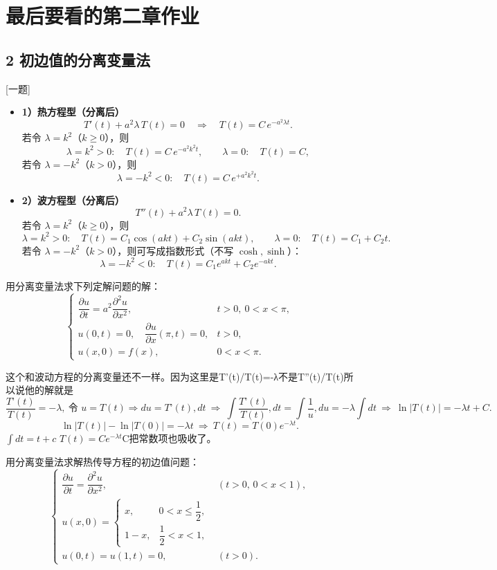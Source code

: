 \chapter{最后要看的第二章作业}
\section{2 初边值的分离变量法}[一题]
\begin{dxtips}
    \begin{itemize}
  \item \textbf{1）热方程型（分离后）}
  \[
  T'(t)+a^{2}\lambda\,T(t)=0
  \quad\Rightarrow\quad
  T(t)=C\,e^{-a^{2}\lambda t}.
  \]
  若令 $\lambda=k^{2}$（$k\ge 0$），则
  \[
  \lambda=k^{2}>0:\quad T(t)=C\,e^{-a^{2}k^{2}t},\qquad
  \lambda=0:\quad T(t)=C,
  \]
  若令 $\lambda=-k^{2}$（$k>0$），则
  \[
  \lambda=-k^{2}<0:\quad T(t)=C\,e^{+a^{2}k^{2}t}.
  \]

  \item \textbf{2）波方程型（分离后）}
  \[
  T''(t)+a^{2}\lambda\,T(t)=0.
  \]
  若令 $\lambda=k^{2}$（$k\ge 0$），则
  \[
  \lambda=k^{2}>0:\quad T(t)=C_{1}\cos(akt)+C_{2}\sin(akt),
  \qquad
  \lambda=0:\quad T(t)=C_{1}+C_{2}t.
  \]
  若令 $\lambda=-k^{2}$（$k>0$），则可写成指数形式（不写 $\cosh,\sinh$）：
  \[
  \lambda=-k^{2}<0:\quad T(t)=C_{1}e^{akt}+C_{2}e^{-akt}.
  \]
\end{itemize}
\end{dxtips}
\begin{homework}[1]
用分离变量法求下列定解问题的解：
\[
\begin{cases}
\dfrac{\partial u}{\partial t}
= a^{2}\dfrac{\partial^{2}u}{\partial x^{2}},
& t>0,\ 0<x<\pi,\\[6pt]
u(0,t)=0,\quad
\dfrac{\partial u}{\partial x}(\pi,t)=0,
& t>0,\\[6pt]
u(x,0)=f(x),
& 0<x<\pi.
\end{cases}
\]
\end{homework}
\begin{dxtips}
这个和波动方程的分离变量还不一样。因为这里是T'(t)/T(t)=-λ不是T''(t)/T(t)所以说他的解就是  $$\frac{T’(t)}{T(t)}=-\lambda,\ \text{令 }u=T(t)\Rightarrow du=T’(t),dt\ \Rightarrow\ \int \frac{T’(t)}{T(t)},dt=\int \frac{1}{u},du=-\lambda\int dt\ \Rightarrow\ \ln|T(t)|=-\lambda t+C.$$
$$\ln|T(t)|-\ln|T(0)|=-\lambda t\ \Rightarrow\ T(t)=T(0)e^{-\lambda t}.$$  $\int dt=t+c$
$T(t)=Ce^{-\lambda t}$C把常数项也吸收了。


\end{dxtips}
\begin{homework}[2]
用分离变量法求解热传导方程的初边值问题：
\[
\begin{cases}
\dfrac{\partial u}{\partial t}
= \dfrac{\partial^2 u}{\partial x^2}, & (t>0,\,0<x<1),\\[6pt]
u(x,0)=
\begin{cases}
x, & 0<x\le\dfrac{1}{2},\\[4pt]
1-x, & \dfrac{1}{2}<x<1,
\end{cases}\\[10pt]
u(0,t)=u(1,t)=0, & (t>0).
\end{cases}
\]
\end{homework}
